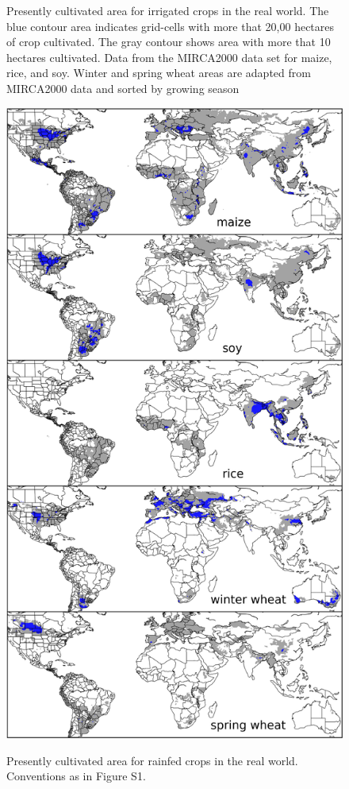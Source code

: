 \documentclass[12pt]{article}
\begin{document}
\begin{figure}[h!]
\begin{minipage}{.45\textwidth}
    \caption{
    Presently cultivated area for irrigated crops in the real world. 
    The blue contour area indicates grid-cells with more that 20,00 hectares of crop cultivated. 
    The gray contour shows area with more that 10 hectares cultivated. Data from the MIRCA2000 data set for maize, rice, and soy. 
    Winter and spring wheat areas are adapted from MIRCA2000 data and sorted by growing season
    }
    \label{fig:irrarea}
\end{minipage}
\hspace{.05\linewidth}
\begin{minipage}{.45\textwidth}
    \centering
    \vspace{-19mm}
    \includegraphics[width=\textwidth]{s_croparea.png}\\
    \caption{Presently cultivated area for rainfed crops in the real world. Conventions as in Figure S1.}
    \label{fig:rainfed}
\end{minipage}
\end{figure}
\end{document}

